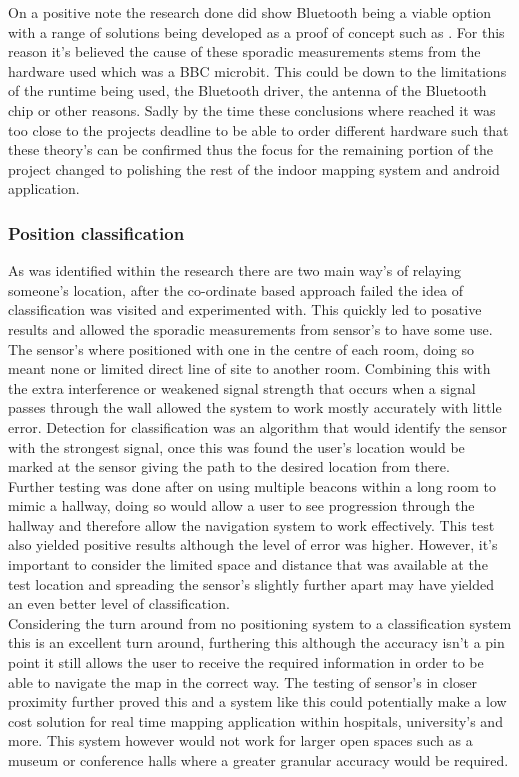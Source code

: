 On a positive note the research done did show Bluetooth being a viable option with a range of solutions being developed as a proof of concept such as \citetemp. For this reason it's believed the cause of these sporadic measurements stems from the hardware used which was a BBC microbit. This could be down to the limitations of the runtime being used, the Bluetooth driver, the antenna of the Bluetooth chip or other reasons. Sadly by the time these conclusions where reached it was too close to the projects deadline to be able to order different hardware such that these theory's can be confirmed thus the focus for the remaining portion of the project changed to polishing the rest of the indoor mapping system and android application.

\subsubsection{Position classification}
As was identified within the research there are two main way's of relaying someone's location, after the co-ordinate based approach failed the idea of classification was visited and experimented with. This quickly led to posative results and allowed the sporadic measurements from sensor's to have some use. The sensor's where positioned with one in the centre of each room, doing so meant none or limited direct line of site to another room. Combining this with the extra interference or weakened signal strength that occurs when a signal passes through the wall allowed the system to work mostly accurately with little error. Detection for classification was an algorithm that would identify the sensor with the strongest signal, once this was found the user's location would be marked at the sensor giving the path to the desired location from there.\\

Further testing was done after on using multiple beacons within a long room to mimic a hallway, doing so would allow a user to see progression through the hallway and therefore allow the navigation system to work effectively. This test also yielded positive results although the level of error was higher. However, it's important to consider the limited space and distance that was available at the test location and spreading the sensor's slightly further apart may have yielded an even better level of classification.\\

Considering the turn around from no positioning system to a classification system this is an excellent turn around, furthering this although the accuracy isn't a pin point it still allows the user to receive the required information in order to be able to navigate the map in the correct way. The testing of sensor's in closer proximity further proved this and a system like this could potentially make a low cost solution for real time mapping application within hospitals, university's and more. This system however would not work for larger open spaces such as a museum or conference halls where a greater granular accuracy would be required.

